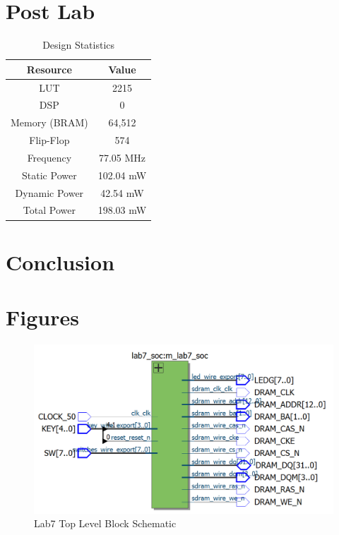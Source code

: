 \documentclass[journal, twocolumn, final,11pt,letterpaper]{IEEEtran}
\begin{document}
\section{Post Lab}
\begin{table}[htbp]
	\centering
	\begin{tabular}{c|c}	%
		\toprule	%
		Resource & Value \\
		\midrule
		LUT & 2215 \\
		DSP & 0\\
		Memory (BRAM) & 64,512 \\
		Flip-Flop & 574 \\
		Frequency &  77.05 MHz\\
		Static Power & 102.04 mW\\
		Dynamic Power & 42.54 mW\\
		Total Power & 198.03 mW\\
		\bottomrule	%
	\end{tabular}%
	\caption{Design Statistics}
	\label{tab:table2}	%
\end{table}%

\section{Conclusion}

\clearpage
\onecolumn
\section{Figures}

\begin{figure} [H]
	\centering
	\includegraphics[scale=0.4]{top-top-circuit.png}
	\caption{Lab7 Top Level Block Schematic\label{fig:top-level}}
\end{figure}
\end{document}
